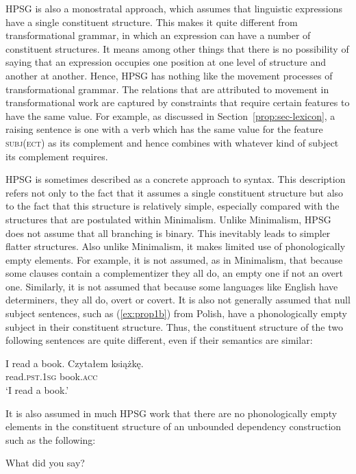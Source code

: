 \documentclass[output=paper
	        ,collection
	        ,collectionchapter
 	        ,biblatex
                ,babelshorthands
                ,newtxmath
                ,draftmode
                ,colorlinks, citecolor=brown
]{langscibook}
\begin{document}
HPSG is also a monostratal approach, which assumes that linguistic expressions have a single constituent structure. This makes it quite different from transformational grammar, in which an expression can have a number of constituent structures. It means among other things that there is no possibility of saying that an expression occupies one position at one level of structure and another at another. Hence, HPSG has nothing like the movement processes of transformational grammar. The relations that are attributed to movement in transformational work are captured by constraints that require certain features to have the same value. For example, as discussed in Section~\ref{prop:sec-lexicon}, a raising sentence is one with a verb which has the same value for the feature \textsc{subj(ect)} as its complement and hence combines with whatever kind of subject its complement requires.

HPSG is sometimes described as a concrete approach to syntax. This description refers not only to the fact that it assumes a single constituent structure but also to the fact that this structure is relatively simple, especially compared with the structures that are postulated within Minimalism. Unlike Minimalism, HPSG does not assume that all branching is binary. This inevitably leads to simpler flatter structures. Also unlike Minimalism, it makes limited use of phonologically empty elements. For example, it is not assumed, as in Minimalism, that because some clauses contain a complementizer they all do, an empty one if not an overt one. Similarly, it is not assumed that because some languages like English have determiners, they all do, overt or covert. It is also not generally assumed that null subject sentences, such as (\ref{ex:prop1b}) from Polish, have a phonologically empty subject in their constituent structure. Thus, the constituent structure of the two following sentences are quite different, even if their semantics are similar:

\ea\label{ex:prop1}
	\ea\label{ex:prop1a}
	I read a book.
	\ex\label{ex:prop1b}
	\gll Czytałem książkę.\\
	read\textsc{.pst.1sg} book\textsc{.acc}\\
	\glt `I read a book.'
	\z
\z

It is also assumed in much HPSG work that there are no phonologically empty elements in the constituent structure of an unbounded dependency construction such as the following:

\ea\label{ex:prop2}
What did you say?
\z
\end{document}
